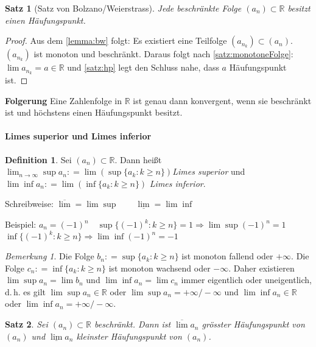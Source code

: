 \documentclass[ngerman,titlepage,twoside, parskip=half*]{scrreprt}
\newcommand*{\R}{\mathbb{R}}
\theoremstyle{plain}
\newtheorem{theorem}{Satz}[section]
\theoremstyle{definition}
\newtheorem{definition}{Definition}
\theoremstyle{remark}
\newtheorem*{remark}{Bemerkung}
\newcommand*{\coloneqq}{\mathrel{\mathop:}=}
\begin{document}
\begin{theorem}[Satz von Bolzano/Weierstrass]
\label{satz:bw}
Jede beschränkte Folge $(a_n)\subset \R$ besitzt einen
Häufungspunkt.
\end{theorem}
\begin{proof}
  Aus dem \autoref{lemma:bw} folgt: Es existiert eine Teilfolge
  $(a_{n_k})\subset (a_n)$. $(a_{n_k})$ ist monoton und
  beschränkt. Daraus folgt nach \autoref{satz:monotoneFolge}: $\lim
  a_{n_k}=a \in \R$ und \autoref{satz:hp} legt den Schluss nahe, dass
  $a$ Häufungspunkt ist.
\end{proof}

\textbf{Folgerung} Eine Zahlenfolge in $\R$ ist genau dann konvergent, wenn sie beschränkt ist und höchstens einen Häufungspunkt besitzt.

\paragraph{Limes superior und Limes inferior}
\begin{definition}
Sei $(a_n) \subset \R$. Dann heißt $\lim_{n\rightarrow \infty} \sup a_n\coloneqq\lim(\sup\{a_k\colon k\geq n\})$\emph{Limes superior} und $\lim \inf a_n \coloneqq 
\lim (\inf\{a_k\colon k\geq n\})$ \emph{Limes inferior}.
\end{definition}

Schreibweise: $\overline{\lim}=\lim \sup \qquad \underline{\lim}=\lim \inf$

Beispiel: $a_n=(-1)^n \quad \sup \{(-1)^k\colon k\geq n\}=1 \Rightarrow \lim \sup (-1)^n=1$\\
$\inf\{(-1)^k\colon k\geq n\} \Rightarrow \lim \inf (-1)^n=-1$

\begin{remark}
Die Folge $b_n\coloneqq\sup \{a_k\colon k\geq n\}$ ist monoton fallend oder $+\infty$. Die Folge $c_n\coloneqq\inf\{a_k\colon k\geq n\}$ ist
monoton wachsend oder $-\infty$. Daher existieren $\lim\sup a_n=\lim b_n$ und $\lim \inf a_n=\lim c_n$ immer eigentlich
oder uneigentlich, d.\,h. es gilt $\lim \sup a_n \in \R$ oder $\lim \sup a_n=+\infty/-\infty$ und 
$\lim \inf a_n \in \R$ oder $\lim \inf a_n=+\infty/-\infty$.
\end{remark}

\begin{theorem}
Sei $(a_n) \subset \R$ beschränkt. Dann ist $\overline{\lim} a_n$ grösster
  Häufungspunkt von $(a_n)$ und $\underline{\lim} a_n$ kleinster Häufungspunkt
  von $(a_n)$.
\end{theorem}
\end{document}
